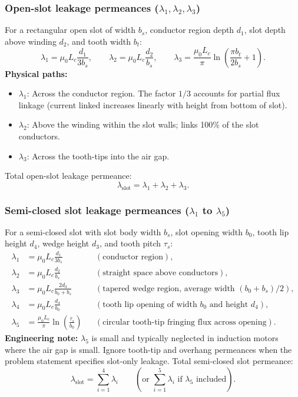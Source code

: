 \subsubsection{Open-slot leakage permeances ($\lambda_1, \lambda_2, \lambda_3$)}
For a rectangular open slot of width \(b_s\), conductor region depth \(d_1\), slot depth above winding \(d_2\), and tooth width \(b_t\):
\[
\lambda_1 = \mu_0 L_c\frac{d_1}{3 b_s},
\qquad
\lambda_2 = \mu_0 L_c\frac{d_2}{b_s},
\qquad
\lambda_3 = \frac{\mu_0 L_c}{\pi}\ln\!\left(\frac{\pi b_t}{2 b_s}+1\right).
\]
\textbf{Physical paths:}
\begin{itemize}
  \item \(\lambda_1\): Across the conductor region. The factor \(1/3\) accounts for partial flux linkage (current linked increases linearly with height from bottom of slot).
  \item \(\lambda_2\): Above the winding within the slot walls; links 100\% of the slot conductors.
  \item \(\lambda_3\): Across the tooth-tips into the air gap.
\end{itemize}
Total open-slot leakage permeance:
\[
\lambda_{\mathrm{slot}} = \lambda_1 + \lambda_2 + \lambda_3.
\]

\subsubsection{Semi-closed slot leakage permeances ($\lambda_1$ to $\lambda_5$)}
For a semi-closed slot with slot body width \(b_s\), slot opening width \(b_0\), tooth lip height \(d_4\), wedge height \(d_3\), and tooth pitch \(\tau_s\):
\[
\begin{aligned}
\lambda_1 &= \mu_0 L_c\frac{d_1}{3 b_s} && (\text{conductor region}),\\
\lambda_2 &= \mu_0 L_c\frac{d_2}{b_s} && (\text{straight space above conductors}),\\
\lambda_3 &= \mu_0 L_c\frac{2 d_3}{b_0+b_s} && (\text{tapered wedge region, average width } (b_0+b_s)/2),\\
\lambda_4 &= \mu_0 L_c\frac{d_4}{b_0} && (\text{tooth lip opening of width } b_0 \text{ and height } d_4),\\
\lambda_5 &= \frac{\mu_0 L_c}{\pi}\ln\!\left(\frac{\tau_s}{b_0}\right) && (\text{circular tooth-tip fringing flux across opening}).
\end{aligned}
\]
\textbf{Engineering note:} \(\lambda_5\) is small and typically neglected in induction motors where the air gap is small. Ignore tooth-tip and overhang permeances when the problem statement specifies slot-only leakage.
Total semi-closed slot permeance:
\[
\lambda_{\mathrm{slot}} = \sum_{i=1}^4 \lambda_i
\qquad(\text{or } \sum_{i=1}^5 \lambda_i\text{ if } \lambda_5\text{ included}).
\]

